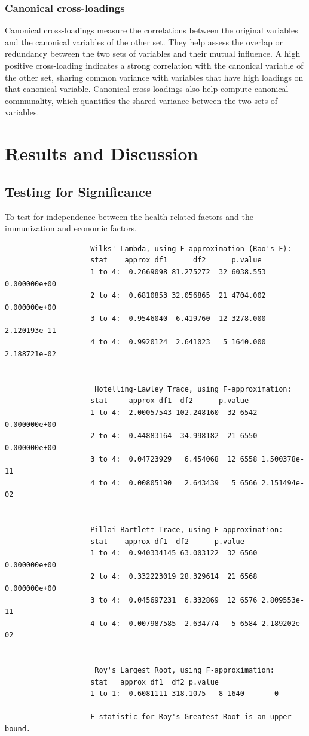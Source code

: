 \documentclass[11pt]{article}
\begin{document}
			\subsubsection{Canonical cross-loadings}
			Canonical cross-loadings measure the correlations between the original variables and the canonical variables of the other set. They help assess the overlap or redundancy between the two sets of variables and their mutual influence. A high positive cross-loading indicates a strong correlation with the canonical variable of the other set, sharing common variance with variables that have high loadings on that canonical variable. Canonical cross-loadings also help compute canonical communality, which quantifies the shared variance between the two sets of variables.

	\section{Results and Discussion}
		\subsection{Testing for Significance}
		
		To test for independence between the health-related factors and the immunization and economic factors,
		
			\begin{tcolorbox}[colback=white, colframe=white]
				\begin{verbatim}
					Wilks' Lambda, using F-approximation (Rao's F):
					stat    approx df1      df2      p.value
					1 to 4:  0.2669098 81.275272  32 6038.553 0.000000e+00
					2 to 4:  0.6810853 32.056865  21 4704.002 0.000000e+00
					3 to 4:  0.9546040  6.419760  12 3278.000 2.120193e-11
					4 to 4:  0.9920124  2.641023   5 1640.000 2.188721e-02
					
					
					 Hotelling-Lawley Trace, using F-approximation:
					stat     approx df1  df2      p.value
					1 to 4:  2.00057543 102.248160  32 6542 0.000000e+00
					2 to 4:  0.44883164  34.998182  21 6550 0.000000e+00
					3 to 4:  0.04723929   6.454068  12 6558 1.500378e-11
					4 to 4:  0.00805190   2.643439   5 6566 2.151494e-02
					
					
					Pillai-Bartlett Trace, using F-approximation:
					stat    approx df1  df2      p.value
					1 to 4:  0.940334145 63.003122  32 6560 0.000000e+00
					2 to 4:  0.332223019 28.329614  21 6568 0.000000e+00
					3 to 4:  0.045697231  6.332869  12 6576 2.809553e-11
					4 to 4:  0.007987585  2.634774   5 6584 2.189202e-02
					
					
					 Roy's Largest Root, using F-approximation:
					stat   approx df1  df2 p.value
					1 to 1:  0.6081111 318.1075   8 1640       0
					
					F statistic for Roy's Greatest Root is an upper bound.
				\end{verbatim}
			\end{tcolorbox}
			
\end{document}

